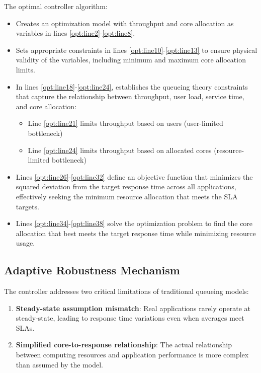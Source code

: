 The optimal controller algorithm:

\begin{itemize}
    \item Creates an optimization model with throughput and core allocation as variables in lines \ref{opt:line2}-\ref{opt:line8}.
    \item Sets appropriate constraints in lines \ref{opt:line10}-\ref{opt:line13} to ensure physical validity of the variables, including minimum and maximum core allocation limits.
    \item In lines \ref{opt:line18}-\ref{opt:line24}, establishes the queueing theory constraints that capture the relationship between throughput, user load, service time, and core allocation:
    \begin{itemize}
        \item Line \ref{opt:line21} limits throughput based on users (user-limited bottleneck)
        \item Line \ref{opt:line24} limits throughput based on allocated cores (resource-limited bottleneck)
    \end{itemize}
    \item Lines \ref{opt:line26}-\ref{opt:line32} define an objective function that minimizes the squared deviation from the target response time across all applications, effectively seeking the minimum resource allocation that meets the SLA targets.
    \item Lines \ref{opt:line34}-\ref{opt:line38} solve the optimization problem to find the core allocation that best meets the target response time while minimizing resource usage.
\end{itemize}

\subsection{Adaptive Robustness Mechanism}

The controller addresses two critical limitations of traditional queueing models:

\begin{enumerate}
    \item \textbf{Steady-state assumption mismatch}: Real applications rarely operate at steady-state, leading to response time variations even when averages meet SLAs.
    \item \textbf{Simplified core-to-response relationship}: The actual relationship between computing resources and application performance is more complex than assumed by the model.
\end{enumerate}


